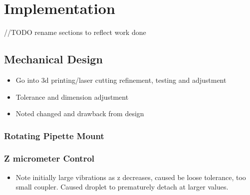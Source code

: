 \chapter{Implementation}\label{C:imp} 


//TODO rename sections to reflect work done
\section{Mechanical Design}

\begin{itemize}
    \item Go into 3d printing/laser cutting refinement, testing and adjustment
    \item Tolerance and dimension adjustment
    \item Noted changed and drawback from design  
\end{itemize}

\subsection{Rotating Pipette Mount}

\subsection{Z micrometer Control}
\begin{itemize}
    \item Note initially large vibrations as z decreases, caused be loose tolerance, too small coupler. Caused droplet to prematurely detach at larger values.  
\end{itemize}


